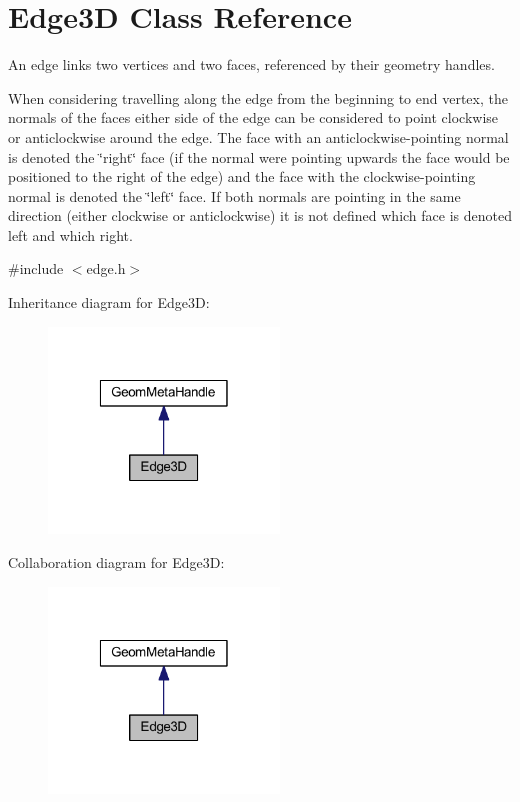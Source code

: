 \hypertarget{class_edge3_d}{\section{Edge3\-D Class Reference}
\label{class_edge3_d}
}


An edge links two vertices and two faces, referenced by their geometry handles.\par
 When considering travelling along the edge from the beginning to end vertex, the normals of the faces either side of the edge can be considered to point clockwise or anticlockwise around the edge. The face with an anticlockwise-\/pointing normal is denoted the \char`\"{}right\char`\"{} face (if the normal were pointing upwards the face would be positioned to the right of the edge) and the face with the clockwise-\/pointing normal is denoted the \char`\"{}left\char`\"{} face. If both normals are pointing in the same direction (either clockwise or anticlockwise) it is not defined which face is denoted left and which right.  




{\ttfamily \#include $<$edge.\-h$>$}



Inheritance diagram for Edge3\-D\-:\nopagebreak
\begin{figure}[H]
\begin{center}
\leavevmode
\includegraphics[width=174pt]{class_edge3_d__inherit__graph}
\end{center}
\end{figure}


Collaboration diagram for Edge3\-D\-:\nopagebreak
\begin{figure}[H]
\begin{center}
\leavevmode
\includegraphics[width=174pt]{class_edge3_d__coll__graph}
\end{center}
\end{figure}
